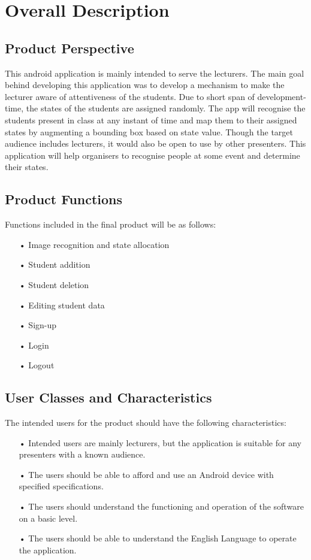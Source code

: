 \documentclass{scrreprt}
\begin{document}
\chapter{Overall Description}

\section{Product Perspective}
This android application is mainly intended to serve the lecturers. The main goal behind developing this application was to develop a mechanism to make the lecturer aware of attentiveness of the students. Due to short span of development-time, the states of the
students are assigned randomly. The app will recognise the students present in class at any instant of time and map them to their assigned states by augmenting a bounding box based on state value. Though the target audience includes lecturers, it would also be open to use by other presenters. This application will help organisers to recognise people at some event and determine their states. 

\section{Product Functions}
Functions included in the final product will be as follows:
\begin{itemize}

\item[•]
Image recognition and state allocation 
\item[•]
Student addition
\item[•]
Student deletion
\item[•]
Editing student data
\item[•]
Sign-up
\item[•]
Login
\item[•]
Logout
\end{itemize}

\section{User Classes and Characteristics}
The intended users for the product should have the following characteristics:
\begin{itemize}
\item[•]
Intended users are mainly lecturers, but the application is suitable for
any presenters with a known audience.
\item[•]
The users should be able to afford and use an Android device with specified specifications.
\item[•]
The users should understand the functioning and operation of the software on a basic level.
\item[•]
The users should be able to understand the English Language to operate the application.
\end{itemize}
\end{document}
